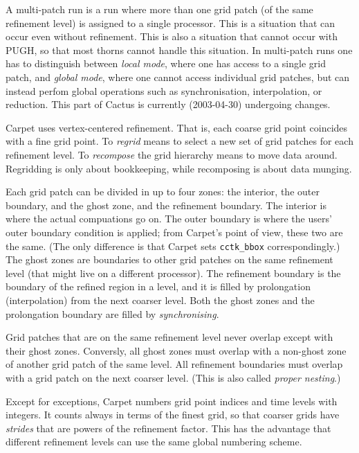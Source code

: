 \documentclass{article}
\begin{document}
   A multi-patch run is a run where more than one grid patch (of the
   same refinement level) is assigned to a single processor.  This is
   a situation that can occur even without refinement.  This is also a
   situation that cannot occur with PUGH, so that most thorns cannot
   handle this situation.  In multi-patch runs one has to distinguish
   between \emph{local mode}, where one has access to a single grid
   patch, and \emph{global mode}, where one cannot access individual
   grid patches, but can instead perfom global operations such as
   synchronisation, interpolation, or reduction.  This part of Cactus
   is currently (2003-04-30) undergoing changes.

   Carpet uses vertex-centered refinement.  That is, each coarse grid
   point coincides with a fine grid point.  To \emph{regrid} means to
   select a new set of grid patches for each refinement level.  To
   \emph{recompose} the grid hierarchy means to move data around.
   Regridding is only about bookkeeping, while recomposing is about
   data munging.

   Each grid patch can be divided in up to four zones: the interior,
   the outer boundary, and the ghost zone, and the refinement
   boundary.  The interior is where the actual compuations go on.  The
   outer boundary is where the users' outer boundary condition is
   applied; from Carpet's point of view, these two are the same.  (The
   only difference is that Carpet sets \texttt{cctk\_bbox}
   correspondingly.)  The ghost zones are boundaries to other grid
   patches on the same refinement level (that might live on a
   different processor).  The refinement boundary is the boundary of
   the refined region in a level, and it is filled by prolongation
   (interpolation) from the next coarser level.  Both the ghost zones
   and the prolongation boundary are filled by \emph{synchronising}.

   Grid patches that are on the same refinement level never overlap
   except with their ghost zones.  Conversly, all ghost zones must
   overlap with a non-ghost zone of another grid patch of the same
   level.  All refinement boundaries must overlap with a grid patch on
   the next coarser level.  (This is also called \emph{proper
   nesting}.)

   Except for exceptions, Carpet numbers grid point indices and time
   levels with integers.  It counts always in terms of the finest
   grid, so that coarser grids have \emph{strides} that are powers of
   the refinement factor.  This has the advantage that different
   refinement levels can use the same global numbering scheme.
\end{document}
